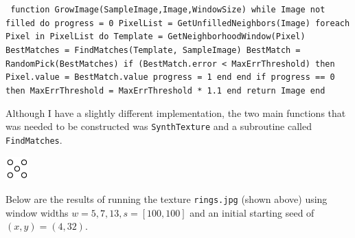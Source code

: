 \documentclass[12pt,twoside]{article}
\newcommand{\tabUnit}{3ex}
\newcommand{\tabT}{\hspace*{\tabUnit}}
\begin{document}
\texttt{
function GrowImage(SampleImage,Image,WindowSize) \newline
\tabT\tabT  while Image not filled do\newline
\tabT\tabT\tabT    progress = 0\newline
\tabT\tabT\tabT    PixelList = GetUnfilledNeighbors(Image)\newline
\tabT\tabT\tabT    foreach Pixel in PixelList do\newline
\tabT\tabT\tabT\tabT     Template = GetNeighborhoodWindow(Pixel)\newline
\tabT\tabT\tabT\tabT     BestMatches = FindMatches(Template, SampleImage)\newline
\tabT\tabT\tabT\tabT     BestMatch = RandomPick(BestMatches)\newline
\tabT\tabT\tabT\tabT     if (BestMatch.error < MaxErrThreshold) then\newline
\tabT\tabT\tabT\tabT\tabT      Pixel.value = BestMatch.value\newline
\tabT\tabT\tabT\tabT\tabT     progress = 1\newline
\tabT\tabT\tabT\tabT    end\newline
\tabT\tabT\tabT   end\newline
\tabT\tabT\tabT   if progress == 0 \newline
\tabT\tabT\tabT\tabT    then MaxErrThreshold = MaxErrThreshold * 1.1\newline
\tabT\tabT end\newline
\tabT\tabT return Image\newline
\tabT end\newline
}
\newline

Although I have a slightly different implementation, the two main functions that was needed to be constructed was \texttt{SynthTexture} and a subroutine called \texttt{FindMatches}.
\newline

\begin{center}
\hspace{100pt}
    \includegraphics[scale=1, trim = 0pt 0pt 0pt 0pt, clip]{rings}\newline
\end{center}

Below are the results of running the texture \texttt{rings.jpg} (shown above) using window widths $w=5,7,13, s = [100,100]$ and an initial starting seed of $(x,y) = (4,32)$.
\end{document}
